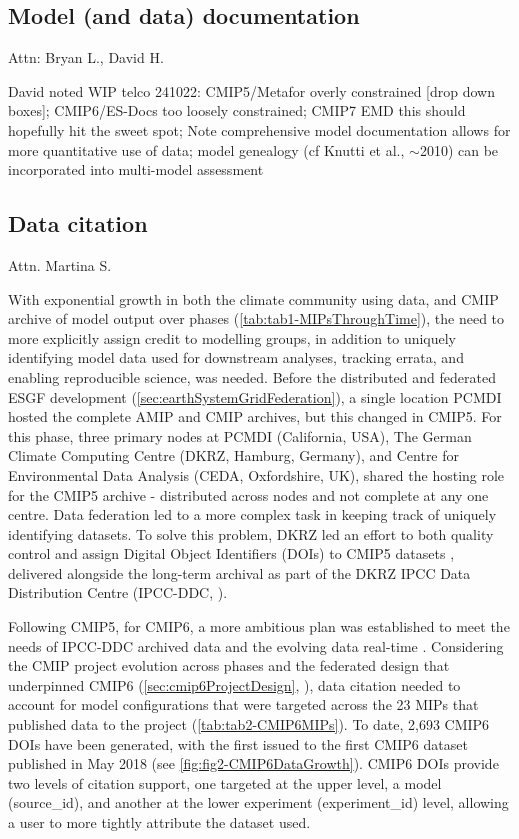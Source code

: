 \documentclass[gmd, preprint]{copernicus}
\def\cred#1{{\color{red}#1}}
\begin{document}
\subsection{Model (and data) documentation}
\cred{Attn: Bryan L., David H.}

\cred{David noted WIP telco 241022: CMIP5/Metafor \citep{guilyardi_cmip5_2011} overly constrained [drop down boxes]; CMIP6/ES-Docs \citep{pascoe_documenting_2020} too loosely constrained; CMIP7 EMD this should hopefully hit the sweet spot; Note comprehensive model documentation allows for more quantitative use of data; model genealogy (cf Knutti et al., ${\sim}$2010) can be incorporated into multi-model assessment}


\subsection{Data citation}
\cred{Attn. Martina S.}

With exponential growth in both the climate community using data, and CMIP archive of model output over phases (\autoref{tab:tab1-MIPsThroughTime}), the need to more explicitly assign credit to modelling groups, in addition to uniquely identifying model data used for downstream analyses, tracking errata, and enabling reproducible science, was needed. Before the distributed and federated ESGF development (\autoref{sec:earthSystemGridFederation}), a single location PCMDI hosted the complete AMIP and CMIP archives, but this changed in CMIP5. For this phase, three primary nodes at PCMDI (California, USA), The German Climate Computing Centre (DKRZ, Hamburg, Germany), and Centre for Environmental Data Analysis (CEDA, Oxfordshire, UK), shared the hosting role for the CMIP5 archive - distributed across nodes and not complete at any one centre. Data federation led to a more complex task in keeping track of uniquely identifying datasets. To solve this problem, DKRZ led an effort to both quality control and assign Digital Object Identifiers (DOIs) to CMIP5 datasets \citep{stockhause_quality_2012, stockhause_cmip6_2017}, delivered alongside the long-term archival as part of the DKRZ IPCC Data Distribution Centre (IPCC-DDC, \citet{stockhause_twenty-five_2022}).

Following CMIP5, for CMIP6, a more ambitious plan was established to meet the needs of IPCC-DDC archived data and the evolving data real-time \citep{stockhause_cmip6_2017}. Considering the CMIP project evolution across phases and the federated design that underpinned CMIP6 (\autoref{sec:cmip6ProjectDesign}, \citet{eyring_overview_2016}), data citation needed to account for model configurations that were targeted across the 23 MIPs that published data to the project (\autoref{tab:tab2-CMIP6MIPs}). To date, 2,693 CMIP6 DOIs have been generated, with the first issued to the first CMIP6 dataset published in May 2018 (see \autoref{fig:fig2-CMIP6DataGrowth}). CMIP6 DOIs provide two levels of citation support, one targeted at the upper level, a model (source\_id), and another at the lower experiment (experiment\_id) level, allowing a user to more tightly attribute the dataset used.
\end{document}
